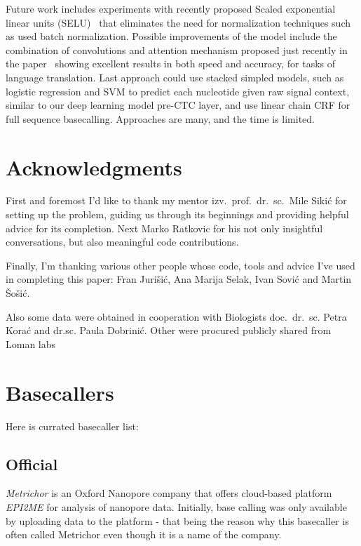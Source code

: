 \documentclass[runningheads,a4paper]{llncs}
\begin{document}
Future work includes experiments with recently proposed Scaled exponential linear units (SELU)~\cite{selu} that eliminates the need for normalization techniques such as used batch normalization. Possible improvements of the model include the combination of convolutions and attention mechanism proposed just recently in the paper~\cite{facebook} showing excellent results in both speed and accuracy, for tasks of language translation. Last approach could use stacked simpled models, such as logistic regression and SVM to predict each nucleotide given raw signal context, similar to our deep learning model pre-CTC layer, and use linear chain CRF for full sequence basecalling. Approaches are many, and the time is limited.

\section{Acknowledgments}

First and foremost I'd like to thank my mentor izv.~prof.~dr.~sc.~Mile Sikić for setting up the problem, guiding us through its beginnings and providing helpful advice for its completion. Next Marko Ratkovic for his not only insightful conversations, but also meaningful code contributions.

Finally, I'm thanking various other people whose code, tools and advice I've used in completing this paper: Fran Jurišić, Ana Marija Selak, Ivan Sović and Martin Šošić.

Also some data were obtained in cooperation with Biologists doc.~dr.~sc. Petra Korać and dr.sc. Paula Dobrinić. Other were procured publicly shared from Loman labs~\cite{loman1-100k}

% 


\appendix
\section{Basecallers}\label{app:basecallers}
Here is currated basecaller list:

\subsection{Official}
\emph{Metrichor} is an Oxford Nanopore company that offers cloud-based platform \emph{EPI2ME} for analysis of nanopore data.
Initially, base calling was only available by uploading data to the platform - that being the reason why this basecaller is often called Metrichor even though it is a name of the company.
\end{document}

